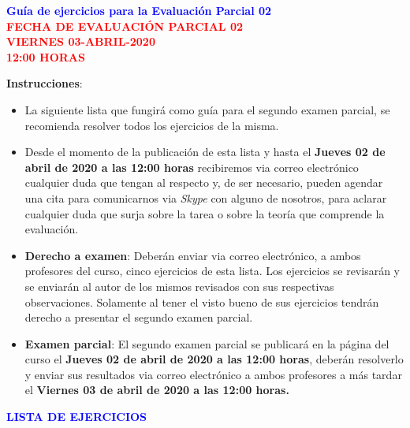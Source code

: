 \documentclass[12pt]{report}
\numberwithin{section}{chapter}
\begin{document}
\begin{center}
\textcolor{blue}{\textbf{\large Guía de ejercicios para la Evaluación Parcial 02}}\\
\vspace{0.5 cm}
\textcolor{red}{\textbf{\large FECHA DE EVALUACIÓN PARCIAL 02 \\ VIERNES 03-ABRIL-2020\\ 12:00 HORAS}}
\end{center}

\textbf{Instrucciones}:
\begin{itemize}
\item La siguiente lista que fungirá como guía para el segundo examen parcial, se recomienda resolver todos los ejercicios de la misma.

\item Desde el momento de la publicación de esta lista y hasta el \textbf{Jueves 02 de abril de 2020 a las 12:00 horas} recibiremos via correo electrónico cualquier duda que tengan al respecto y, de ser necesario, pueden agendar una cita para comunicarnos via \textit{Skype} con alguno de nosotros, para aclarar cualquier duda que surja sobre la tarea o sobre la teoría que comprende la evaluación.

\item \textbf{Derecho a examen}: Deberán enviar via correo electrónico, a ambos profesores del curso, cinco ejercicios de esta lista. Los ejercicios se revisarán y se enviarán al autor de los mismos revisados con sus respectivas observaciones. Solamente al tener el visto bueno de sus ejercicios tendrán derecho a presentar el segundo examen parcial.

\item \textbf{Examen parcial}: El segundo examen parcial se publicará en la página del curso el \textbf{Jueves 02 de abril de 2020 a las 12:00 horas}, deberán resolverlo y enviar sus resultados via correo electrónico a ambos profesores a más tardar el \textbf{Viernes 03 de abril de 2020 a las 12:00 horas.} 
\end{itemize}

\vspace{1cm}


\begin{center}
\textcolor{blue}{\textbf{\large LISTA DE EJERCICIOS}}
\end{center}
\end{document}
